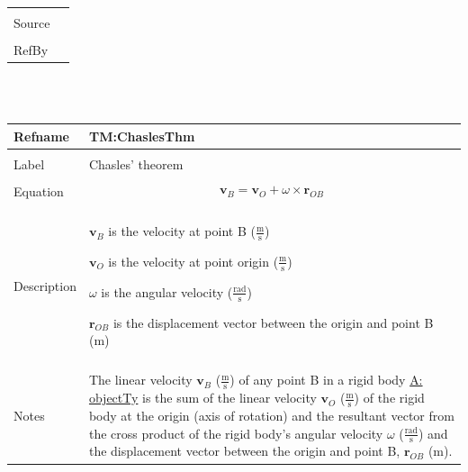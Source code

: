 \documentclass[12pt]{article}
\begin{document}
\begin{minipage}{\textwidth}
\begin{tabular}{p{} p{}}
                                         \\ \midrule \\
                                         Source & \\ \midrule \\
                                                  RefBy & 
\\ \bottomrule \end{tabular}
\end{minipage}\\
~\newline
 \noindent \begin{minipage}{\textwidth}
\begin{tabular}{p{} p{}}
\toprule \textbf{Refname} & \textbf{TM:ChaslesThm}
\label{TM:ChaslesThm}
\\ \midrule \\
Label & Chasles' theorem
        \\ \midrule \\
        Equation & \begin{displaymath}
                   {\mathbf{v}_{B}}={\mathbf{v}_{O}}+ω\times{\mathbf{r}_{OB}}
                   \end{displaymath}
                   \\ \midrule \\
                   Description & \begin{symbDescription}
                                 \item{${\mathbf{v}_{B}}$ is the velocity at point B ($\frac{\text{m}}{\text{s}}$)}
                                 \item{${\mathbf{v}_{O}}$ is the velocity at point origin ($\frac{\text{m}}{\text{s}}$)}
                                 \item{$ω$ is the angular velocity ($\frac{\text{rad}}{\text{s}}$)}
                                 \item{${\mathbf{r}_{OB}}$ is the displacement vector between the origin and point B (m)}
                                 \end{symbDescription}
                                 \\ \midrule \\
                                 Notes & The linear velocity ${\mathbf{v}_{B}}$ ($\frac{\text{m}}{\text{s}}$) of any point B in a rigid body \hyperref[A:objectTy]{A: objectTy} is the sum of the linear velocity ${\mathbf{v}_{O}}$ ($\frac{\text{m}}{\text{s}}$) of the rigid body at the origin (axis of rotation) and the resultant vector from the cross product of the rigid body's angular velocity $ω$ ($\frac{\text{rad}}{\text{s}}$) and the displacement vector between the origin and point B, ${\mathbf{r}_{OB}}$ (m).

\end{tabular}
\end{minipage}
\end{document}
